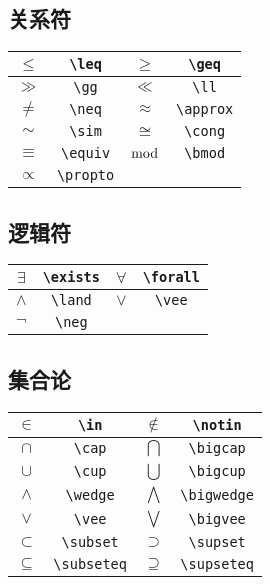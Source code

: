 \documentclass[a4paper,10pt]{ctexart}
\begin{document}
\subsection{关系符}
\begin{table}[H]
	\begin{center}
		\begin{tabular}{|c|c|c|c|}
		\hline
		$\leq$ &\verb|\leq| &$\geq$ &\verb|\geq|\\
		\hline
		$\gg$ &\verb|\gg| &$\ll$ &\verb|\ll|\\
		\hline
		$\neq$ &\verb|\neq| &$\approx$ &\verb|\approx|\\
		\hline
		$\sim$ &\verb|\sim| &$\cong$ &\verb|\cong|\\
		\hline
		$\equiv$ &\verb|\equiv| &$\bmod$ &\verb|\bmod|\\
		\hline
		$\propto$ &\verb|\propto|&&\\
		\hline
		\end{tabular}
	\end{center}
\end{table}


\subsection{逻辑符}
\begin{table}[H]
	\begin{center}
		\begin{tabular}{|c|c|c|c|}
		\hline
		$\exists$ &\verb|\exists| &$\forall$ &\verb|\forall|\\
		\hline
		$\land$ &\verb|\land| &$\vee$ &\verb|\vee|\\
		\hline
		$\neg$ &\verb|\neg|&&\\
		\hline
		\end{tabular}
	\end{center}
\end{table}


\subsection{集合论}
\begin{table}[H]
	\begin{center}
		\begin{tabular}{|c|c|c|c|}
		\hline
		$\in$ &\verb|\in| &$\notin$ &\verb|\notin|\\
		\hline
		$\cap$ &\verb|\cap| &$\bigcap$ &\verb|\bigcap|\\
		\hline
		$\cup$ &\verb|\cup| &$\bigcup$ &\verb|\bigcup|\\
		\hline
		$\wedge$ &\verb|\wedge| &$\bigwedge$ &\verb|\bigwedge|\\
		\hline
		$\vee$ &\verb|\vee| &$\bigvee$ &\verb|\bigvee|\\
		\hline
		$\subset$ &\verb|\subset| &$\supset$ &\verb|\supset|\\
		\hline
		$\subseteq$ &\verb|\subseteq| &$\supseteq$ &\verb|\supseteq|\\
		\hline
		\end{tabular}
	\end{center}
\end{table}
\end{document}
